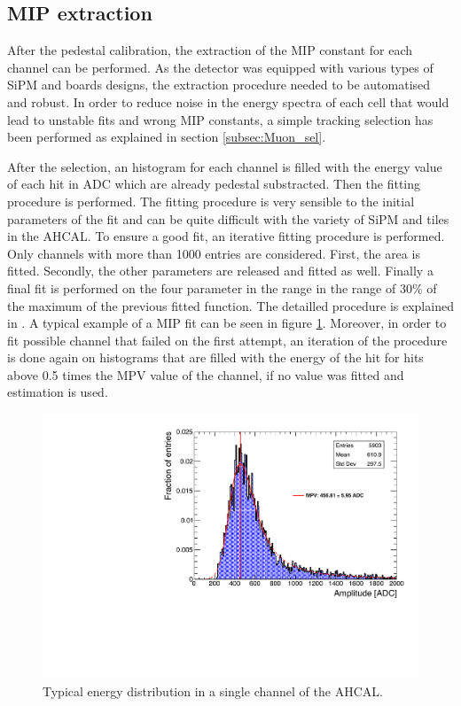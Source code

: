 \subsection{MIP extraction}

After the pedestal calibration, the extraction of the MIP constant for each channel can be performed. As the detector was equipped with various types of SiPM and boards designs, the extraction procedure needed to be automatised and robust. In order to reduce noise in the energy spectra of each cell that would lead to unstable fits and wrong MIP constants, a simple tracking selection has been performed as explained in section \ref{subsec:Muon_sel}.

After the selection, an histogram for each channel is filled with the energy value of each hit in ADC which are already pedestal substracted. Then the fitting procedure is performed. The fitting procedure is very sensible to the initial parameters of the fit and can be quite difficult with the variety of SiPM and tiles in the AHCAL. To ensure a good fit, an iterative fitting procedure is performed. Only channels with more than 1000 entries are considered. First, the area is fitted. Secondly, the other parameters are released and fitted as well. Finally a final fit is performed on the four parameter in the range in the range of 30\% of the maximum of the previous fitted function. The detailled procedure is explained in \cite{FabianThesis}. A typical example of a MIP fit can be seen in figure \ref{fig:MIPFit}. Moreover, in order to fit possible channel that failed on the first attempt, an iteration of the procedure is done again on histograms that are filled with the energy of the hit for hits above 0.5 times the MPV value of the channel, if no value was fitted and estimation is used.

\begin{figure}[htbp!]
	\centering
	\includegraphics[width=0.7\linewidth]{chap5/fig_EnergyCalib/ExampleMIP_Module3.pdf}
	\caption{Typical energy distribution in a single channel of the AHCAL.} \label{fig:MIPFit}
\end{figure}

